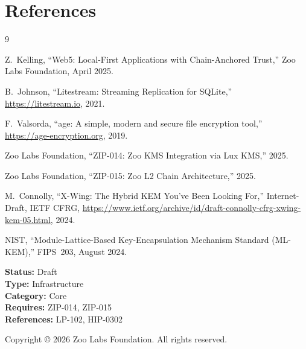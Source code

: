 \section{References}


\begin{thebibliography}{9}

Z.~Kelling, ``Web5: Local-First Applications with Chain-Anchored
Trust,'' Zoo Labs Foundation, April 2025.

B.~Johnson, ``Litestream: Streaming Replication for SQLite,''
\url{https://litestream.io}, 2021.

F.~Valsorda, ``age: A simple, modern and secure file encryption
tool,'' \url{https://age-encryption.org}, 2019.

Zoo Labs Foundation, ``ZIP-014: Zoo KMS Integration via Lux KMS,''
2025.

Zoo Labs Foundation, ``ZIP-015: Zoo L2 Chain Architecture,''
2025.

M.~Connolly, ``X-Wing: The Hybrid KEM You've Been Looking For,''
Internet-Draft, IETF CFRG,
\url{https://www.ietf.org/archive/id/draft-connolly-cfrg-xwing-kem-05.html},
2024.

NIST, ``Module-Lattice-Based Key-Encapsulation Mechanism Standard
(ML-KEM),'' FIPS~203, August 2024.

\end{thebibliography}

\vspace{1em}
\noindent\textbf{Status:} Draft\\
\noindent\textbf{Type:} Infrastructure\\
\noindent\textbf{Category:} Core\\
\noindent\textbf{Requires:} ZIP-014, ZIP-015\\
\noindent\textbf{References:} LP-102, HIP-0302

\vspace{0.5em}
\noindent Copyright \copyright{} 2026 Zoo Labs Foundation.
All rights reserved.

